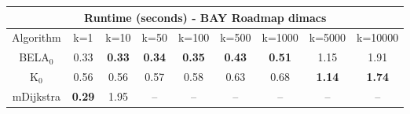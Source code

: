 \begin{tabular}{c|cccccccc}\toprule
\multicolumn{9}{c}{Runtime (seconds) - BAY Roadmap dimacs}\\ \midrule
Algorithm & k=1 & k=10 & k=50 & k=100 & k=500 & k=1000 & k=5000 & k=10000 \\ \midrule
BELA$_0$ & 0.33 & \textbf{0.33} & \textbf{0.34} & \textbf{0.35} & \textbf{0.43} & \textbf{0.51} & 1.15 & 1.91 \\
K$_0$ & 0.56 & 0.56 & 0.57 & 0.58 & 0.63 & 0.68 & \textbf{1.14} & \textbf{1.74} \\
mDijkstra & \textbf{0.29} & 1.95 & -- & -- & -- & -- & -- & -- \\ \bottomrule 
\end{tabular}
